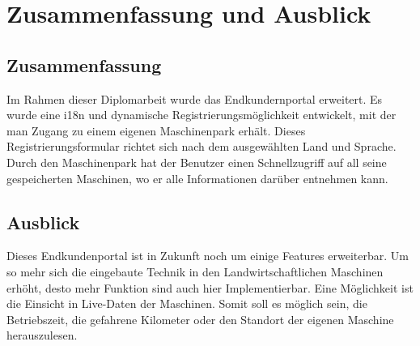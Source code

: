 \chapter{Zusammenfassung und Ausblick}
\section{Zusammenfassung}
Im Rahmen dieser Diplomarbeit wurde das Endkundernportal erweitert. Es wurde eine i18n und dynamische Registrierungsmöglichkeit entwickelt, mit der man Zugang zu einem eigenen Maschinenpark erhält. Dieses Registrierungsformular richtet sich nach dem ausgewählten Land und Sprache. Durch den Maschinenpark hat der Benutzer einen Schnellzugriff auf all seine gespeicherten Maschinen, wo er alle Informationen darüber entnehmen kann.
\section{Ausblick}
Dieses Endkundenportal ist in Zukunft noch um einige Features erweiterbar. Um so mehr sich die eingebaute Technik in den Landwirtschaftlichen Maschinen erhöht, desto mehr Funktion sind auch hier Implementierbar. Eine Möglichkeit ist die Einsicht in Live-Daten der Maschinen. Somit soll es möglich sein, die Betriebszeit, die gefahrene Kilometer oder den Standort der eigenen Maschine herauszulesen.